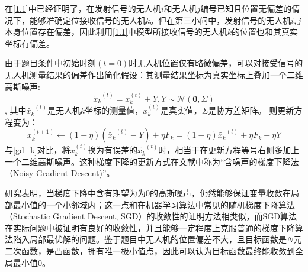 \documentclass[withoutpreface,bwprint]{cumcmthesis} %
\begin{document}
在\ref{1.1}中已经证明了，在发射信号的无人机$i$和无人机$j$编号已知且位置无偏差的情况下，能够准确定位接收信号的无人机$k$。但在第三小问中，发射信号的无人机$i,j$本身位置存在偏差，因此利用\ref{1.1}中模型所接收信号的无人机$k$的位置也和其真实坐标有偏差。

由于题目条件中初始时刻$(t=0)$时无人机位置仅有略微偏差，可以对接受信号的无人机测量结果的偏差作出简化假设：其测量结果坐标为真实坐标上叠加一个二维高斯噪声:
$$
\tilde{x_k}^{(t)} = x_k^{(t)} + Y,Y\sim \mathcal{N}(\textbf{0},{{\Sigma}})
$$,
其中$\tilde{x_k}^{(t)}$是无人机$k$坐标的测量值，$x_k^{(t)}$是真实值，$\Sigma$是协方差矩阵。
则更新方程变为：
\begin{equation}
    x_k^{(t+1)} \gets (1-\eta) (\tilde{x_k}^{(t)} - Y) + \eta F_k = (1-\eta) \tilde{x_k}^{(t)} + \eta F_k + \eta Y
\end{equation}
与\ref{gd_k}对比，将$x_k^{(t)}$换为有误差的$\tilde{x_k}^{(t)}$时，相当于在更新方程等号右侧多加上一个二维高斯噪声。这种梯度下降的更新方式在文献中称为“含噪声的梯度下降法（Noisy Gradient Descent)”。

研究表明，当梯度下降中含有期望为为0的高斯噪声，仍然能够保证变量收敛在局部最小值的一个小邻域内\cite{wu2020noisy}\cite{smith2020generalization}；这一点和在机器学习算法中常见的随机梯度下降算法（Stochastic Gradient Descent, SGD）的收敛性的证明方法相类似，而SGD算法在实际问题中被证明有良好的收敛性，并且能够一定程度上克服普通的梯度下降算法陷入局部最优解的问题。鉴于题目中无人机的位置偏差不大，且目标函数是$N$元二次函数，是凸函数，拥有唯一极小值点，因此可以认为目标函数最终能收敛到全局最小值$0$。
\end{document}

